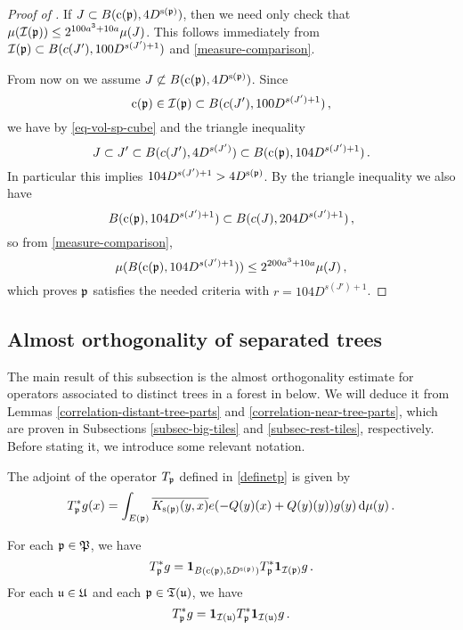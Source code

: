 \begin{proof}[Proof of ]
    If $J \subset B({\mathrm{c}}({\mathfrak p}), 4 D^{{\mathrm{s}}({\mathfrak p})})$, then we need only check that
    $\mu({\mathcal{I}}({\mathfrak p})) \le 2^{100a^3 + 10a} \mu(J)$. This follows immediately from
    ${\mathcal{I}}({\mathfrak p}) \subset B(c(J'), 100 D^{s(J') + 1})$ and \eqref{measure-comparison}.

    From now on we assume $J \not \subset B({\mathrm{c}}({\mathfrak p}), 4 D^{{\mathrm{s}}({\mathfrak p})})$. Since
    \begin{equation*}
        {\mathrm{c}}({\mathfrak p}) \in {\mathcal{I}}({\mathfrak p}) \subset B(c(J'), 100 D^{s(J') + 1})\, ,
    \end{equation*}
    we have by \eqref{eq-vol-sp-cube} and the triangle inequality
    $$
        J \subset J' \subset B(c(J'), 4D^{s(J')}) \subset B({\mathrm{c}}({\mathfrak p}), 104 D^{s(J') + 1})\,.
    $$
    In particular this implies $104 D^{s(J') + 1} > 4D^{{\mathrm{s}}({\mathfrak p})}$. By the triangle inequality
    we also have
    $$
        B({\mathrm{c}}({\mathfrak p}), 104 D^{s(J') + 1}) \subset B(c(J), 204 D^{s(J') + 1})\,,
    $$
    so from \eqref{measure-comparison},
    $$
        \mu( B({\mathrm{c}}({\mathfrak p}), 104 D^{s(J') + 1})) \le 2^{200a^3 + 10a} \mu(J)\,,
    $$
    which proves ${\mathfrak p}$ satisfies the needed criteria with $r=104 D^{s(J') + 1}$.

\end{proof}

\subsection{Almost orthogonality of separated trees}

The main result of this subsection is the almost orthogonality estimate for operators associated to distinct trees in a forest in  below. We will deduce it from Lemmas \ref{correlation-distant-tree-parts} and \ref{correlation-near-tree-parts}, which are proven in Subsections \ref{subsec-big-tiles} and \ref{subsec-rest-tiles}, respectively. Before stating it, we introduce some relevant notation.

The adjoint of the operator $T_{{\mathfrak p}}$ defined in \eqref{definetp} is given by
\begin{equation}
    \label{definetp*}
    T_{{\mathfrak p}}^* g(x) = \int_{E({\mathfrak p})} \overline{K_{{\mathrm{s}}({\mathfrak p})}(y,x)} e(-{Q}(y)(x)+ {Q}(y)(y)) g(y) \, \mathrm{d}\mu(y)\,.
\end{equation}

\begin{lemma}
    \label{adjoint-tile-support}
    \leanok
    For each ${\mathfrak p} \in {\mathfrak P}$, we have
    $$
        T_{{\mathfrak p}}^* g = \mathbf{1}_{B({\mathrm{c}}({\mathfrak p}), 5D^{{\mathrm{s}}({\mathfrak p})})} T_{{\mathfrak p}}^* \mathbf{1}_{{\mathcal{I}}({\mathfrak p})} g\,.
    $$
    For each ${\mathfrak u} \in {\mathfrak U}$ and each ${\mathfrak p} \in {\mathfrak T}({\mathfrak u})$, we have
    $$
        T_{{\mathfrak p}}^* g = \mathbf{1}_{{\mathcal{I}}({\mathfrak u})} T_{{\mathfrak p}}^* \mathbf{1}_{{\mathcal{I}}({\mathfrak u})} g\,.
    $$
\end{lemma}

